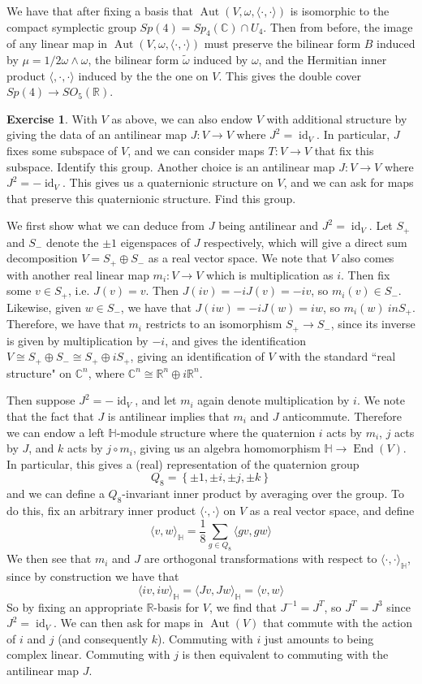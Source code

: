 \documentclass[psamsfonts]{amsart}
\theoremstyle{definition}
\newtheorem{exer}[thm]{Exercise}
\theoremstyle{remark}
\newcommand{\R}{\mathbb{R}}
\renewcommand{\H}{\mathbb{H}}
\newcommand{\C}{\mathbb{C}}
\newcommand{\inv}{^{-1}}
\newcommand{\set}[1]{\left\lbrace #1 \right\rbrace}
\DeclareMathOperator{\id}{id}
\DeclareMathOperator{\Aut}{Aut}
\DeclareMathOperator{\End}{End}
\begin{document}
We have that after fixing a basis that $\Aut(V, \omega, \langle \cdot, \cdot \rangle)$ is isomorphic to the compact symplectic group $Sp(4) = Sp_4(\C) \cap U_4$. Then from before, the image of any linear map in $\Aut(V, \omega, \langle \cdot,\cdot \rangle)$ must preserve the bilinear form $B$ induced by $\mu = 1/2 \omega \wedge \omega$, the bilinear form $\tilde{\omega}$ induced by $\omega$, and the Hermitian inner product $\langle, \cdot, \cdot \rangle$ induced by the the one on $V$. This gives the double cover $Sp(4) \to SO_5(\R)$.
%
\begin{exer}
With $V$ as above, we can also endow $V$ with additional structure by giving the data of an antilinear map $J : V \to V$ where $J^2 = \id_V$. In particular, $J$ fixes some subspace of $V$, and we can consider maps $T : V \to V$ that fix this subspace. Identify this group. Another choice is an antilinear map $J : V \to V$ where $J^2 = -\id_V$. This gives us a quaternionic structure on $V$, and we can ask for maps that preserve this quaternionic structure. Find this group.
\end{exer}
We first show what we can deduce from $J$ being antilinear and $J^2 = \id_V$. Let $S_+$ and $S_-$ denote the $\pm 1$ eigenspaces of $J$ respectively, which will give a direct sum decomposition $V = S_+ \oplus S_-$ as a real vector space. We note that $V$ also comes with another real linear map $m_i : V \to V$ which is multiplication as $i$. Then fix some $v \in S_+$, i.e. $J(v) = v$. Then $J(iv) = -iJ(v) = -iv$, so $m_i(v) \in S_-$. Likewise, given $w \in S_-$, we have that $J(iw) = -iJ(w) = iw$, so $m_i(w) \ in S_+$. Therefore, we have that $m_i$ restricts to an isomorphism $S_+ \to S_-$, since its inverse is given by multiplication by $-i$, and gives the identification $V \cong S_+ \oplus S_- \cong S_+ \oplus iS_+$, giving an identification of $V$ with the standard ``real structure" on $\C^n$, where $\C^n \cong \R^n \oplus i\R^n$.

Then suppose $J^2 = -\id_V$, and let $m_i$ again denote multiplication by $i$. We note that the fact that $J$ is antilinear implies that $m_i$ and $J$ anticommute. Therefore we can endow a left $\H$-module structure where the quaternion $i$ acts by $m_i$, $j$ acts by $J$, and $k$ acts by $j \circ m_i$, giving us an algebra homomorphism $\H \to \End(V)$. In particular, this gives a (real) representation of the quaternion group 
$$Q_8 = \set{\pm 1, \pm i, \pm j, \pm k}$$
and we can define a $Q_8$-invariant inner product by averaging over the group. To do this, fix an arbitrary inner product $\langle \cdot,\cdot \rangle$ on $V$ as a real vector space, and define
$$\langle v, w \rangle_\H = \frac{1}{8}\sum_{g \in Q_8} \langle gv, gw \rangle $$
We then see that $m_i$ and $J$ are orthogonal transformations with respect to $\langle \cdot,\cdot \rangle_\H$, since by construction we have that 
$$\langle iv,iw \rangle_\H = \langle Jv, Jw \rangle_\H = \langle v,w \rangle $$
So by fixing an appropriate $\R$-basis for $V$, we find that $J\inv = J^T$, so $J^T = J^3$ since $J^2 = \id_V$.
We can then ask for maps in $\Aut(V)$ that commute with the action of $i$ and $j$ (and consequently $k$). Commuting with $i$ just amounts to being complex linear. Commuting with $j$ is then equivalent to commuting with the antilinear map $J$.
%
\setcounter{section}{11}
%
\setcounter{thm}{0}
%
\end{document}
